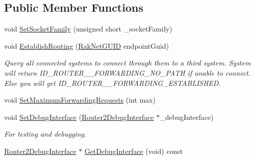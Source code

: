 \subsection*{Public Member Functions}
\begin{DoxyCompactItemize}
\item 
void \hyperlink{class_rak_net_1_1_router2_aef586b4fc73d446119225e05384c8515}{Set\-Socket\-Family} (unsigned short \-\_\-socket\-Family)
\item 
void \hyperlink{class_rak_net_1_1_router2_a8d86939663f286f21a8aefeea615565b}{Establish\-Routing} (\hyperlink{struct_rak_net_1_1_rak_net_g_u_i_d}{Rak\-Net\-G\-U\-I\-D} endpoint\-Guid)
\begin{DoxyCompactList}\small\item\em Query all connected systems to connect through them to a third system. System will return I\-D\-\_\-\-R\-O\-U\-T\-E\-R\-\_\-\_\-\-F\-O\-R\-W\-A\-R\-D\-I\-N\-G\-\_\-\-N\-O\-\_\-\-P\-A\-T\-H if unable to connect. Else you will get I\-D\-\_\-\-R\-O\-U\-T\-E\-R\-\_\-\_\-\-F\-O\-R\-W\-A\-R\-D\-I\-N\-G\-\_\-\-E\-S\-T\-A\-B\-L\-I\-S\-H\-E\-D. \end{DoxyCompactList}\item 
void \hyperlink{class_rak_net_1_1_router2_a60d0f2bffeed81aabcde1daa6d0cd79d}{Set\-Maximum\-Forwarding\-Requests} (int max)
\item 
\hypertarget{class_rak_net_1_1_router2_ada3cd3f17fadd1466d0ad0ed693fbf69}{void \hyperlink{class_rak_net_1_1_router2_ada3cd3f17fadd1466d0ad0ed693fbf69}{Set\-Debug\-Interface} (\hyperlink{struct_rak_net_1_1_router2_debug_interface}{Router2\-Debug\-Interface} $\ast$\-\_\-debug\-Interface)}\label{class_rak_net_1_1_router2_ada3cd3f17fadd1466d0ad0ed693fbf69}

\begin{DoxyCompactList}\small\item\em For testing and debugging. \end{DoxyCompactList}\item 
\hypertarget{class_rak_net_1_1_router2_a3f096833e216ffb5c3c79a45fa26fc3b}{\hyperlink{struct_rak_net_1_1_router2_debug_interface}{Router2\-Debug\-Interface} $\ast$ \hyperlink{class_rak_net_1_1_router2_a3f096833e216ffb5c3c79a45fa26fc3b}{Get\-Debug\-Interface} (void) const }\label{class_rak_net_1_1_router2_a3f096833e216ffb5c3c79a45fa26fc3b}


\end{DoxyCompactItemize}
